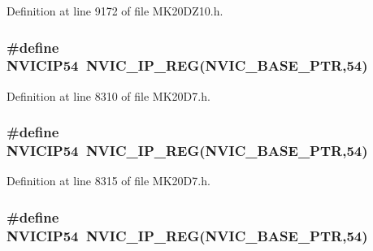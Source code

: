 Definition at line 9172 of file M\+K20\+D\+Z10.\+h.

\subsubsection[{\texorpdfstring{N\+V\+I\+C\+I\+P54}{NVICIP54}}]{\setlength{\rightskip}{0pt plus 5cm}\#define N\+V\+I\+C\+I\+P54~{\bf N\+V\+I\+C\+\_\+\+I\+P\+\_\+\+R\+EG}({\bf N\+V\+I\+C\+\_\+\+B\+A\+S\+E\+\_\+\+P\+TR},54)}\hypertarget{group___n_v_i_c___register___accessor___macros_gab5f93e5f778f20502398ca5168147f91}{}\label{group___n_v_i_c___register___accessor___macros_gab5f93e5f778f20502398ca5168147f91}


Definition at line 8310 of file M\+K20\+D7.\+h.

\subsubsection[{\texorpdfstring{N\+V\+I\+C\+I\+P54}{NVICIP54}}]{\setlength{\rightskip}{0pt plus 5cm}\#define N\+V\+I\+C\+I\+P54~{\bf N\+V\+I\+C\+\_\+\+I\+P\+\_\+\+R\+EG}({\bf N\+V\+I\+C\+\_\+\+B\+A\+S\+E\+\_\+\+P\+TR},54)}\hypertarget{group___n_v_i_c___register___accessor___macros_gab5f93e5f778f20502398ca5168147f91}{}\label{group___n_v_i_c___register___accessor___macros_gab5f93e5f778f20502398ca5168147f91}


Definition at line 8315 of file M\+K20\+D7.\+h.

\subsubsection[{\texorpdfstring{N\+V\+I\+C\+I\+P54}{NVICIP54}}]{\setlength{\rightskip}{0pt plus 5cm}\#define N\+V\+I\+C\+I\+P54~{\bf N\+V\+I\+C\+\_\+\+I\+P\+\_\+\+R\+EG}({\bf N\+V\+I\+C\+\_\+\+B\+A\+S\+E\+\_\+\+P\+TR},54)}\hypertarget{group___n_v_i_c___register___accessor___macros_gab5f93e5f778f20502398ca5168147f91}{}\label{group___n_v_i_c___register___accessor___macros_gab5f93e5f778f20502398ca5168147f91}


